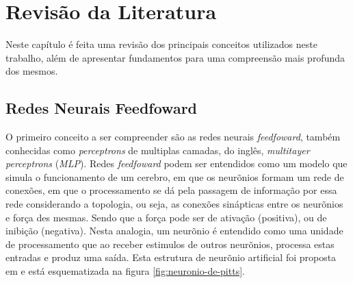 \chapter{Revisão da Literatura}
\label{sec-literatura}

Neste capítulo é feita uma revisão dos principais conceitos utilizados neste
trabalho, além de apresentar fundamentos para uma compreensão mais profunda dos
mesmos.

\section{Redes Neurais Feedfoward}

O primeiro conceito a ser compreender são as redes neurais \textit{feedfoward},
também conhecidas como \textit{perceptrons} de multiplas camadas, do inglês,
\textit{multitayer perceptrons} (\textit{MLP}). Redes \textit{feedfoward} 
podem ser entendidos como um modelo que simula o funcionamento de um cerebro,
em que os neurõnios formam um rede de conexões, em que o processamento se dá
pela passagem de informação por essa rede considerando a topologia, ou seja, as
conexões sinápticas entre os neurõnios e força des mesmas. Sendo que a força
pode ser de ativação (positiva), ou de inibição (negativa).
Nesta analogia, um neurõnio é entendido como uma unidade de processamento que 
ao receber estimulos de outros neurõnios, processa estas entradas e 
produz uma saída. Esta estrutura de neurõnio artificial foi proposta em 
\cite{mcculloch-pitts:1943-perceptron} e está esquematizada na figura 
\ref{fig:neuronio-de-pitts}.  

